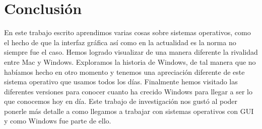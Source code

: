 \documentclass[stu, 12pt, letterpaper, donotrepeattitle, floatsintext, natbib, helv]{apa7}
\begin{document}
\section*{Conclusión}
{}

En este trabajo escrito aprendimos varias cosas sobre sistemas operativos, como el hecho de que la interfaz gráfica así como en la actualidad es la norma no siempre fue el caso. Hemos logrado visualizar de una manera diferente la rivalidad entre Mac y Windows. Exploramos la historia de Windows, de tal manera que no habíamos hecho en otro momento y tenemos una apreciación diferente de este sistema operativo que usamos todos los días. Finalmente hemos visitado las diferentes versiones para conocer cuanto ha crecido Windows para llegar a ser lo que conocemos hoy en día. Este trabajo de investigación nos gustó al poder ponerle más detalle a como llegamos a trabajar con sistemas operativos con GUI y como Windows fue parte de ello.

\newpage
\renewcommand\refname{\large\textbf{Referencias}}

\end{document}

